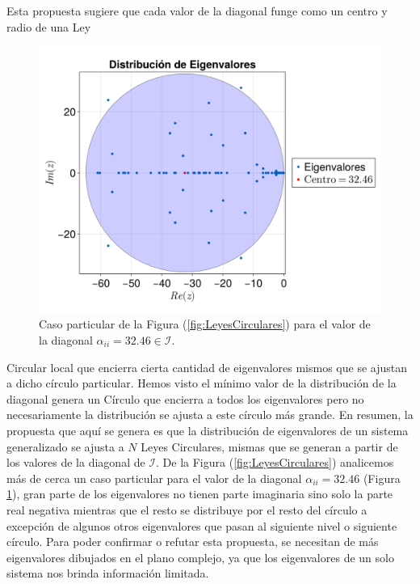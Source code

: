 Esta propuesta sugiere que cada valor de la diagonal funge como un centro y radio de una Ley 
\begin{figure} \vspace{-30pt} \begin{center}
	\includegraphics[scale=0.13]{../Imagenes/LeyCircularParticular}
	\end{center}
	\vspace{-20pt} 
	\caption{Caso particular de la Figura (\ref{fig:LeyesCirculares}) para el valor de la diagonal $\alpha_{ii}=32.46\in\mathcal{I}$.}
		\vspace{-10pt}
	\label{fig:LeyCircularParticular}
\end{figure}
Circular local que encierra cierta cantidad de eigenvalores mismos que se ajustan a dicho círculo particular. Hemos visto el mínimo valor de la distribución de la diagonal genera un Círculo que encierra a todos los eigenvalores pero no necesariamente la distribución se ajusta a este círculo más grande. En resumen, la propuesta que aquí se genera es que la distribución de eigenvalores de un sistema generalizado se ajusta a $N$ Leyes Circulares, mismas que se generan a partir de los valores de la diagonal de $\mathcal{I}$. De la Figura (\ref{fig:LeyesCirculares}) analicemos más de cerca un caso particular para el valor de la diagonal $\alpha_{ii}=32.46$ (Figura \ref{fig:LeyCircularParticular}), gran parte de los eigenvalores no tienen parte imaginaria sino solo la parte real negativa mientras que el resto se distribuye por el resto del círculo a excepción de algunos otros eigenvalores que pasan al siguiente nivel o siguiente círculo. Para poder confirmar o refutar esta propuesta, se necesitan de más eigenvalores dibujados en el plano complejo, ya que los eigenvalores de un solo sistema nos brinda información limitada.

